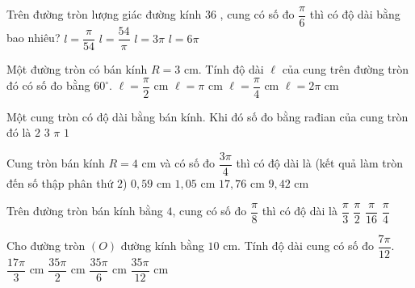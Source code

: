 \begin{ex}%
	Trên đường tròn lượng giác đường kính $36$ , cung có số đo $\dfrac{\pi}{6}$ thì có độ dài bằng bao nhiêu?
	\choice
	{$l=\dfrac{\pi}{54}$}
	{$l=\dfrac{54}{\pi}$}
	{\True$l=3 \pi$}
	{$l=6 \pi$}
\end{ex}
\begin{ex}%
	Một đường tròn có bán kính $R=3$ cm. Tính độ dài $\ell$ của cung trên đường tròn đó có số đo bằng $60^{\circ}$.
	\choice
	{$\ell=\dfrac{\pi}{2}$ cm}
	{\True $\ell=\pi $ cm}
	{$\ell=\dfrac{\pi}{4}$ cm}
	{$\ell=2\pi$ cm}
\end{ex}

\begin{ex}%
	Một cung tròn có độ dài bằng bán kính. Khi đó số đo bằng rađian của cung tròn đó là
	\choice
	{$2$}
	{$3$}
	{$\pi $}
	{\True $1$}
\end{ex}

\begin{ex}%
	Cung tròn bán kính $ R=4 $ cm và có số đo $ \dfrac{3\pi}{4} $ thì có độ dài là (kết quả làm tròn đến số thập phân thứ $ 2 $)
	\choice
	{$ 0{,59} $ cm}
	{$ 1{,}05 $ cm}
	{$ 17{,}76 $ cm}
	{\True $ 9{,}42 $ cm}
\end{ex}

\begin{ex}%
	Trên đường tròn bán kính bằng $4$, cung có số đo $\dfrac{\pi}{8}$ thì có độ dài là
	\choice
	{$\dfrac{\pi}{3}$}
	{\True $\dfrac{\pi}{2}$}
	{$\dfrac{\pi}{16}$}
	{$\dfrac{\pi}{4}$}
\end{ex}

\begin{ex}%
	Cho đường tròn $ (O) $ đường kính bằng $ 10 $ cm. Tính độ dài cung có số đo $ \dfrac{7\pi}{12} $.
	\choice
	{$ \dfrac{17\pi}{3} $ cm}
	{$ \dfrac{35\pi}{2} $ cm}
	{$ \dfrac{35\pi}{6} $ cm}
	{\True $ \dfrac{35\pi}{12} $ cm}
\end{ex}

